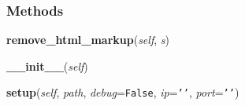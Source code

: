    \label{Cache:FileCache}


  \subsubsection{Methods}

    \label{Cache:FileCache:remove_html_markup}

    \vspace{0.5ex}

\hspace{.8\funcindent}\begin{boxedminipage}{\funcwidth}

    \raggedright \textbf{remove\_html\_markup}(\textit{self}, \textit{s})

\setlength{\parskip}{2ex}
\setlength{\parskip}{1ex}
    \end{boxedminipage}

    \label{Cache:FileCache:__init__}

    \vspace{0.5ex}

\hspace{.8\funcindent}\begin{boxedminipage}{\funcwidth}

    \raggedright \textbf{\_\_init\_\_}(\textit{self})

\setlength{\parskip}{2ex}
\setlength{\parskip}{1ex}
    \end{boxedminipage}

    \label{Cache:FileCache:setup}

    \vspace{0.5ex}

\hspace{.8\funcindent}\begin{boxedminipage}{\funcwidth}

    \raggedright \textbf{setup}(\textit{self}, \textit{path}, \textit{debug}={\tt False}, \textit{ip}={\tt \texttt{'}\texttt{}\texttt{'}}, \textit{port}={\tt \texttt{'}\texttt{}\texttt{'}})

\setlength{\parskip}{2ex}
\setlength{\parskip}{1ex}
    \end{boxedminipage}

